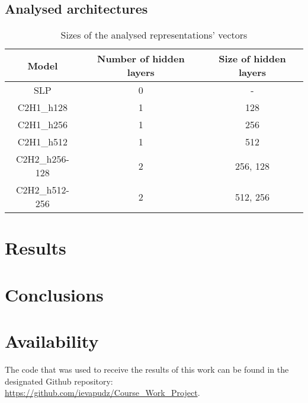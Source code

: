 \documentclass[12pt]{article}
\begin{document}
	\subsection{Analysed architectures}

	\begin{table}[h!]
		\caption{Sizes of the analysed representations' vectors}
		\vspace{0.2cm}
		\centering
		\begin{tabular}{ | c | c c | }
			\hline 
			Model & Number of hidden layers & Size of hidden layers \\
			\hline 
			SLP & 0 & - \\
			C2H1\_h128 & 1 & 128 \\
			C2H1\_h256 & 1 & 256 \\
			C2H1\_h512 & 1 & 512 \\
			C2H2\_h256-128 & 2 & 256, 128 \\
			C2H2\_h512-256 & 2 & 512, 256 \\
			\hline    
		\end{tabular}
		\label{table:modelArchitectures}
	\end{table}

	\pagebreak

	\section{Results}

	\pagebreak

	\section{Conclusions}


	\section{Availability}

	The code that was used to receive the results of this work can be found
	in the designated Github repository: 
	\href{https://github.com/ievapudz/Course_Work_Project}{https://github.com/ievapudz/Course\_Work\_Project}.

	\newpage
	
	\nocite{*}
	
	\normalsize

 

\end{document}
